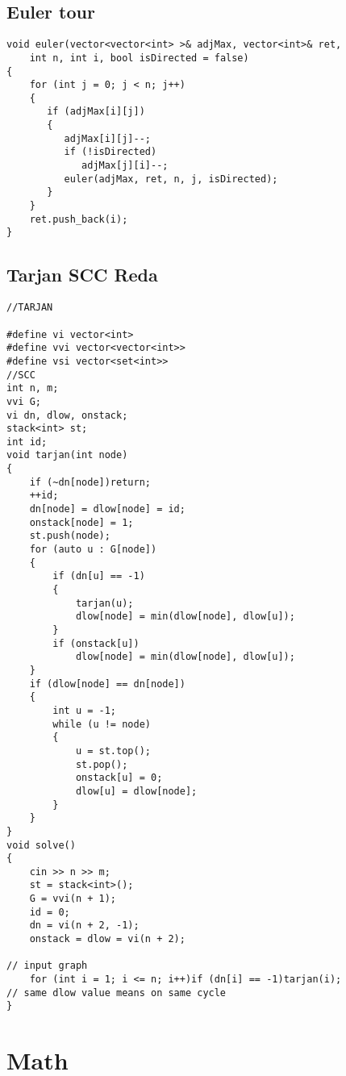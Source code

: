 \documentclass{article}
\begin{document}
\subsection{Euler tour}
\begin{verbatim}
void euler(vector<vector<int> >& adjMax, vector<int>& ret,  
    int n, int i, bool isDirected = false)  
{  
    for (int j = 0; j < n; j++)  
    {  
       if (adjMax[i][j])  
       {  
          adjMax[i][j]--;  
          if (!isDirected)  
             adjMax[j][i]--;  
          euler(adjMax, ret, n, j, isDirected);  
       }  
    }  
    ret.push_back(i);  
}
\end{verbatim}

\subsection{Tarjan SCC Reda}
\begin{verbatim}
//TARJAN  

#define vi vector<int>
#define vvi vector<vector<int>>
#define vsi vector<set<int>>
//SCC  
int n, m;
vvi G;
vi dn, dlow, onstack;
stack<int> st;
int id;
void tarjan(int node)
{
	if (~dn[node])return;
	++id;
	dn[node] = dlow[node] = id;
	onstack[node] = 1;
	st.push(node);
	for (auto u : G[node])
	{
		if (dn[u] == -1)
		{
			tarjan(u);
			dlow[node] = min(dlow[node], dlow[u]);
		}
		if (onstack[u])
			dlow[node] = min(dlow[node], dlow[u]);
	}
	if (dlow[node] == dn[node])
	{
		int u = -1;
		while (u != node)
		{
			u = st.top();
			st.pop();
			onstack[u] = 0;
			dlow[u] = dlow[node];
		}
	}
}
void solve()
{
	cin >> n >> m;
	st = stack<int>();
	G = vvi(n + 1);
	id = 0;
	dn = vi(n + 2, -1);
	onstack = dlow = vi(n + 2);

// input graph  
	for (int i = 1; i <= n; i++)if (dn[i] == -1)tarjan(i);
// same dlow value means on same cycle  
}
\end{verbatim}

\section{Math}
\end{document}
